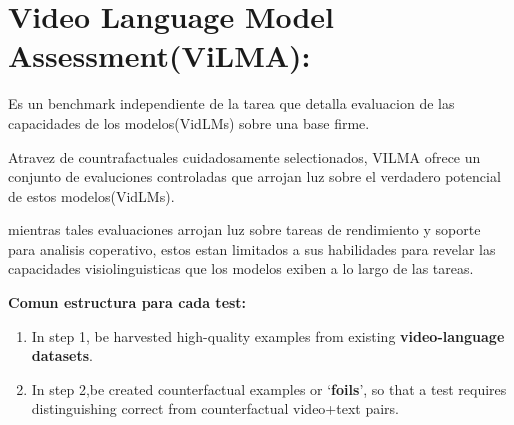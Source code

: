 \section{Video Language Model Assessment(ViLMA):}

Es un benchmark independiente de la tarea que detalla evaluacion de las capacidades de los modelos(VidLMs) sobre una base firme.

Atravez de countrafactuales cuidadosamente selectionados, VILMA ofrece un conjunto de evaluciones controladas que arrojan luz sobre el verdadero potencial de estos modelos(VidLMs).

mientras tales evaluaciones arrojan luz sobre tareas de rendimiento y soporte para analisis coperativo, estos estan limitados a sus habilidades para revelar las capacidades visiolinguisticas que los modelos exiben a lo largo de las tareas.

\textbf{Comun estructura para cada test:}
\begin{enumerate}
\item In step 1, be harvested high-quality examples from existing \textbf{video-language datasets}.
\item In step 2,be created counterfactual examples or ‘\textbf{foils}’, so that a test requires distinguishing correct from counterfactual video+text pairs. 
\end{enumerate}
